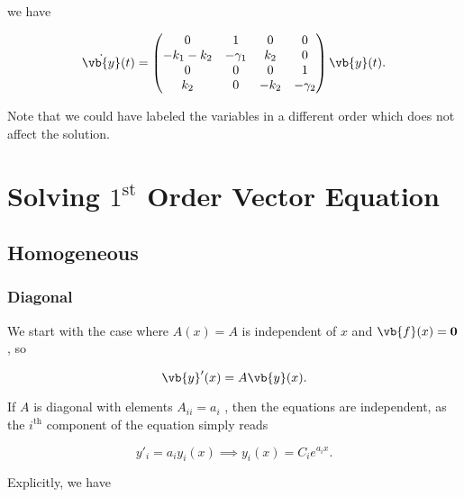 \documentclass[english,a4paper,12pt]{report}
\begin{document}
we have 

\begin{equation}
    \dot{\vb{y} }(t) = \begin{pmatrix}
        0 & 1 & 0 &  0 \\
        -k_1 -k_2  & -\gamma _{1}  & k_2  & 0  \\
        0 & 0 & 0 & 1  \\
        k_2  & 0 & -k_2  & -\gamma _{2}   \\
    \end{pmatrix} \vb{y} (t).
\end{equation}

Note that we could have labeled the variables in a different order which does not affect the solution.

\section{Solving \(1^{\text{st} } \) Order Vector Equation}

\subsection{Homogeneous}\label{homosys}

\subsubsection{Diagonal}

We start with the case where \(A(x) = A\) is independent of \(x\) and \(\vb{f} (x) = \boldsymbol{0} \), so

\begin{equation}
    \vb{y}'(x) = A \vb{y}(x).  
\end{equation}

If \(A\) is diagonal with elements \(A_{ii} = a_{i}\) , then the equations are independent, as the \(i^{\text{th}} \) component of the equation simply reads

\begin{equation}
    y'_{i} = a_{i} y_{i}(x) \implies y_{i} (x) = C_{i}e^{a_{i}x }. 
\end{equation}

Explicitly, we have
\end{document}

